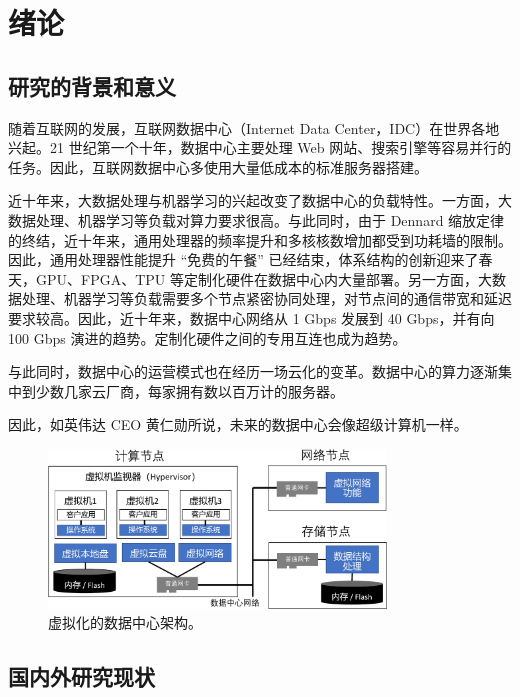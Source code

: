 \chapter{绪论}

\section{研究的背景和意义}

随着互联网的发展，互联网数据中心（Internet Data Center，IDC）在世界各地兴起。21 世纪第一个十年，数据中心主要处理 Web 网站、搜索引擎等容易并行的任务。因此，互联网数据中心多使用大量低成本的标准服务器搭建。

近十年来，大数据处理与机器学习的兴起改变了数据中心的负载特性。一方面，大数据处理、机器学习等负载对算力要求很高。与此同时，由于 Dennard 缩放定律的终结，近十年来，通用处理器的频率提升和多核核数增加都受到功耗墙的限制。因此，通用处理器性能提升 ``免费的午餐'' 已经结束，体系结构的创新迎来了春天，GPU、FPGA、TPU 等定制化硬件在数据中心内大量部署。另一方面，大数据处理、机器学习等负载需要多个节点紧密协同处理，对节点间的通信带宽和延迟要求较高。因此，近十年来，数据中心网络从 1 Gbps 发展到 40 Gbps，并有向 100 Gbps 演进的趋势。定制化硬件之间的专用互连也成为趋势。

与此同时，数据中心的运营模式也在经历一场云化的变革。数据中心的算力逐渐集中到少数几家云厂商，每家拥有数以百万计的服务器。

因此，如英伟达 CEO 黄仁勋所说，未来的数据中心会像超级计算机一样。




\begin{figure}[htbp]
	\centering
	\includegraphics[width=0.8\textwidth]{figures/virt_arch.pdf}
	\caption{虚拟化的数据中心架构。}
	\label{background:fig:virt-architecture}
\end{figure}

\section{国内外研究现状}




